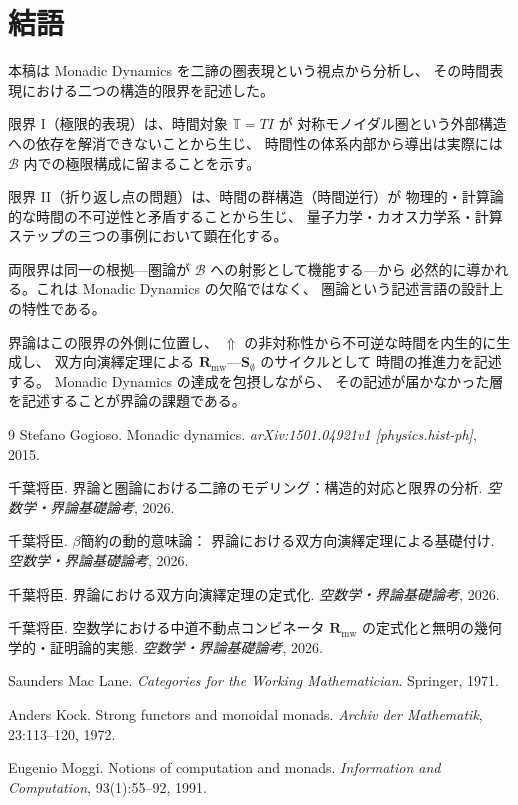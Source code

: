 \documentclass[11pt,a4paper]{ltjsarticle}
\newcommand{\metanegation}{\Uparrow}
\newcommand{\Rmw}{\mathbf{R}_{\mathrm{mw}}}
\newcommand{\Svoid}{\mathbf{S}_{\emptyset}}
\newcommand{\Bval}{\mathcal{B}}
\theoremstyle{definition}
\begin{document}
\section{結語}

本稿は Monadic Dynamics を二諦の圏表現という視点から分析し、
その時間表現における二つの構造的限界を記述した。

限界 I（極限的表現）は、時間対象 $\mathbb{T} = TI$ が
対称モノイダル圏という外部構造への依存を解消できないことから生じ、
時間性の体系内部から導出は実際には $\Bval$ 内での極限構成に留まることを示す。

限界 II（折り返し点の問題）は、時間の群構造（時間逆行）が
物理的・計算論的な時間の不可逆性と矛盾することから生じ、
量子力学・カオス力学系・計算ステップの三つの事例において顕在化する。

両限界は同一の根拠---圏論が $\Bval$ への射影として機能する---から
必然的に導かれる。これは Monadic Dynamics の欠陥ではなく、
圏論という記述言語の設計上の特性である。

界論はこの限界の外側に位置し、
$\metanegation$ の非対称性から不可逆な時間を内生的に生成し、
双方向演繹定理による $\Rmw$—$\Svoid$ のサイクルとして
時間の推進力を記述する。
Monadic Dynamics の達成を包摂しながら、
その記述が届かなかった層を記述することが界論の課題である。

\begin{thebibliography}{9}
Stefano Gogioso.
\newblock Monadic dynamics.
\newblock \emph{arXiv:1501.04921v1 [physics.hist-ph]}, 2015.

千葉将臣.
\newblock 界論と圏論における二諦のモデリング：構造的対応と限界の分析.
\newblock \emph{空数学・界論基礎論考}, 2026.

千葉将臣.
\newblock $\beta$簡約の動的意味論：
界論における双方向演繹定理による基礎付け.
\newblock \emph{空数学・界論基礎論考}, 2026.

千葉将臣.
\newblock 界論における双方向演繹定理の定式化.
\newblock \emph{空数学・界論基礎論考}, 2026.

千葉将臣.
\newblock 空数学における中道不動点コンビネータ
$\mathbf{R}_{\mathrm{mw}}$ の定式化と無明の幾何学的・証明論的実態.
\newblock \emph{空数学・界論基礎論考}, 2026.

Saunders Mac Lane.
\newblock \emph{Categories for the Working Mathematician}.
\newblock Springer, 1971.

Anders Kock.
\newblock Strong functors and monoidal monads.
\newblock \emph{Archiv der Mathematik}, 23:113--120, 1972.

Eugenio Moggi.
\newblock Notions of computation and monads.
\newblock \emph{Information and Computation}, 93(1):55--92, 1991.
\end{thebibliography}
\end{document}
